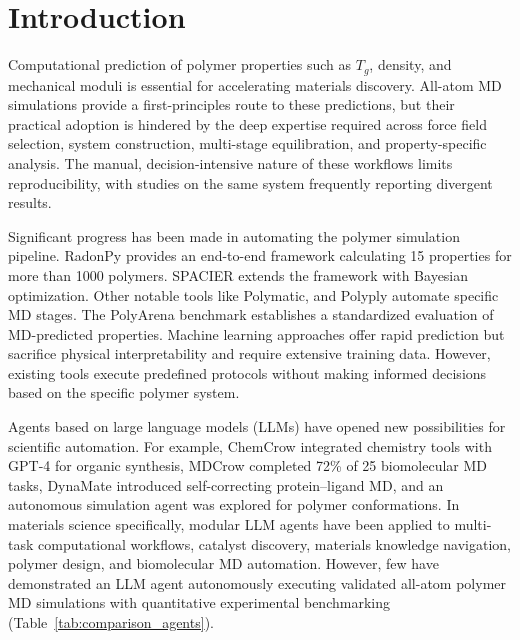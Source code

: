 \documentclass[journal=acsami,manuscript=article]{achemso}
\begin{document}
\section{Introduction}

Computational prediction of polymer properties such as $T_g$, density, and mechanical moduli is essential for accelerating materials discovery.\cite{bicerano2002prediction}
All-atom MD simulations provide a first-principles route to these predictions,\cite{kremer2009multiscale} but their practical adoption is hindered by the deep expertise required across force field selection, system construction, multi-stage equilibration, and property-specific analysis.\cite{larsen2011molecular, hayashi2022radonpy}
The manual, decision-intensive nature of these workflows limits reproducibility, with studies on the same system frequently reporting divergent results.\cite{patrone2016uncertainty, suter2025ensemble}

Significant progress has been made in automating the polymer simulation pipeline.
RadonPy\cite{hayashi2022radonpy} provides an end-to-end framework calculating 15 properties for more than 1000 polymers. SPACIER\cite{nanjo2025spacier} extends the framework with Bayesian optimization. Other notable tools like Polymatic,\cite{abbott2013polymatic} and Polyply\cite{grunewald2022polyply} automate specific MD stages. The PolyArena benchmark\cite{polyarena2025} establishes a standardized evaluation of MD-predicted properties.
Machine learning approaches offer rapid prediction but sacrifice physical interpretability and require extensive training data\cite{tao2021benchmarking, chaudhari2024alloybert}. However, existing tools execute predefined protocols without making informed decisions based on the specific polymer system.

Agents based on large language models (LLMs) have opened new possibilities for scientific automation.
For example, ChemCrow\cite{bran2024chemcrow} integrated chemistry tools with GPT-4 for organic synthesis, MDCrow\cite{campbell2025mdcrow} completed 72\% of 25 biomolecular MD tasks, DynaMate\cite{guilbert2025dynamate} introduced self-correcting protein--ligand MD, and an autonomous simulation agent was explored for polymer conformations.\cite{liu2025asa}
In materials science specifically, modular LLM agents have been applied to multi-task computational workflows,\cite{chaudhari2025modular} catalyst discovery,\cite{ock2026adsorb} materials knowledge navigation,\cite{zhuang2026natural} polymer design,\cite{nigam2026polymeragent} and biomolecular MD automation.\cite{chandrasekhar2025namdagent}
However, few have demonstrated an LLM agent autonomously executing validated all-atom polymer MD simulations with quantitative experimental benchmarking (Table~\ref{tab:comparison_agents}).
\end{document}
